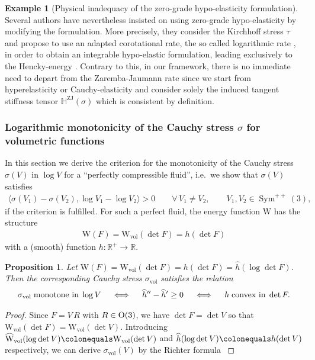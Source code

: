 \documentclass[10pt]{article}
\newcounter{theoremCounter}
\numberwithin{theoremCounter}{section}
\theoremstyle{plain}
\newtheorem{prop}[theoremCounter]{Proposition}
\theoremstyle{definition}
\newtheorem{example}[theoremCounter]{Example}
\newcommand{\R}{\mathbb{R}}
\newcommand{\OO}{{\rm O}}
\newcommand{\WW}{\mathrm{W}}
\DeclareMathOperator{\Sym}{Sym}
\DeclareMathOperator{\ZJ}{ZJ}
\DeclareMathOperator{\vol}{vol}
\def\H{\mathbb{H}}
\numberwithin{equation}{section}
\begin{document}
\begin{appendix}
\begin{example}[Physical inadequacy of the zero-grade hypo-elasticity formulation]
\footnotetext
{
Several authors have nevertheless insisted on using  zero-grade hypo-elasticity by modifying the formulation. More precisely, they consider the Kirchhoff stress $\tau$ and propose to use an adapted corotational rate, the so called logarithmic rate \cite{xiao97, xiao98_2,xiao1999existence},  in order to obtain an integrable hypo-elastic formulation, leading exclusively to the Hencky-energy \cite{Neff_Osterbrink_Martin_Hencky13}. Contrary to this, in our framework, there is no immediate need to depart from the Zaremba-Jaumann rate since we start from hyperelasticity or Cauchy-elasticity and consider solely the induced tangent stiffness tensor $\H^{\ZJ}(\sigma)$ which is consistent by definition.
}
\end{example}
%
\subsubsection{Logarithmic monotonicity of the Cauchy stress $\sigma$ for volumetric functions} \label{appvolufunc}
%
In this section we derive the criterion for the monotonicity of the Cauchy stress $\sigma(V)$ in $\log V$ for a ``perfectly compressible fluid'', i.e.~we show that $\sigma(V)$ satisfies
	\begin{align}
	\label{eqmonotonicityinlog01}
	\langle \sigma(V_1) - \sigma(V_2), \log V_1 - \log V_2 \rangle > 0 \qquad \forall \, V_1 \neq V_2, \qquad V_1, V_2 \in \Sym^{++}(3),
	\end{align}
if the criterion is fulfilled. For such a perfect fluid, the energy function $\WW$ has the structure
	\begin{align}
	\WW(F) = \WW_{\vol}(\det F) = h(\det F)
	\end{align}
with a (smooth) function $h: \R^+ \to \R$. 
%
\begin{prop}
Let $\WW(F) = \WW_{\vol}(\det F) = h(\det F) = \widehat{h}(\log \det F)$. Then the corresponding Cauchy stress $\sigma_{\vol}$ satisfies the relation
	\begin{align}
	\sigma_{\textnormal{vol}} \; \textnormal{monotone in} \; \log V \quad \iff \quad \widehat{h}'' - \widehat{h}' \ge 0 \quad \iff \quad h \; \textnormal{convex in} \; \det F.
	\end{align}
\end{prop}
%
\begin{proof}
Since $F = V \, R$ with $R \in \OO(3)$, we have $\det F = \det V$ so that $\WW_{\vol}(\det F) = \WW_{\vol}(\det V)$. Introducing $\widehat{\WW}_{\vol}(\log \det V) \colonequals \WW_{\vol}(\det V)$ and $\widehat{h}(\log \det V) \colonequals h(\det V)$ respectively, we can derive $\sigma_{\vol}(V)$ by the Richter formula \cite{richter1948isotrope,vallee1978lois}

\end{proof}
\end{appendix}
\end{document}
